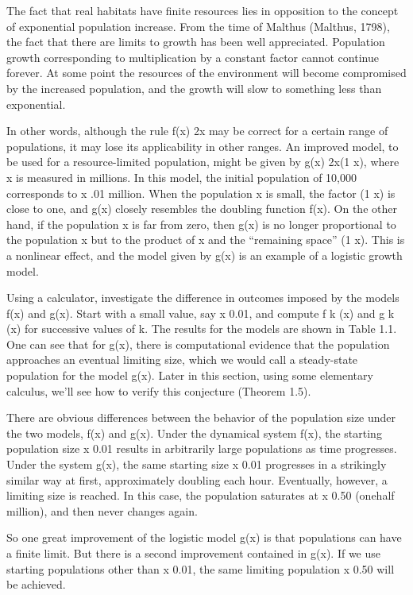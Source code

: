 \documentclass[12pt]{article}
\begin{document}
The fact that real habitats have finite resources lies in opposition to the concept of exponential 
population increase. From the time of Malthus (Malthus, 1798), the fact that there are limits to growth has 
been well appreciated. Population growth corresponding to multiplication by a constant factor cannot 
continue forever. At some point the resources of the environment will become compromised by the increased 
population, and the growth will slow to something less than exponential.

In other words, although the rule f(x)  2x may be correct for a certain range of populations, it may lose 
its applicability in other ranges. An improved model, to be used for a resource-limited population, might 
be given by g(x)  2x(1  x), where x is measured in millions. In this model, the initial population of 
10,000 corresponds to x  .01 million. When the population x is small, the factor (1  x) is close to one, 
and g(x) closely resembles the doubling function f(x). On the other hand, if the population x is far from 
zero, then g(x) is no longer proportional to the population x but to the product of x and the “remaining 
space” (1  x). This is a nonlinear effect, and the model given by g(x) is an example of a logistic growth 
model.

Using a calculator, investigate the difference in outcomes imposed by the models f(x) and g(x). Start with 
a small value, say x  0.01, and compute f k (x) and g k (x) for successive values of k. The results for the 
models are shown in Table 1.1. One can see that for g(x), there is computational evidence that the 
population approaches an eventual limiting size, which we would call a steady-state population for the 
model g(x). Later in this section, using some elementary calculus, we’ll see how to verify this conjecture 
(Theorem 1.5).

There are obvious differences between the behavior of the population size under the two models, f(x) and 
g(x). Under the dynamical system f(x), the starting population size x  0.01 results in arbitrarily large 
populations as time progresses. Under the system g(x), the same starting size x  0.01 progresses in a 
strikingly similar way at first, approximately doubling each hour. Eventually, however, a limiting size is 
reached. In this case, the population saturates at x  0.50 (onehalf million), and then never changes again.

So one great improvement of the logistic model g(x) is that populations can have a finite limit. But there 
is a second improvement contained in g(x). If we use starting populations other than x  0.01, the same 
limiting population x  0.50 will be achieved.
\end{document}
